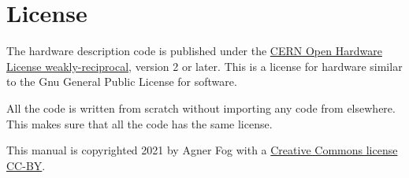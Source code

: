 \documentclass[11pt,a4paper,oneside,openright]{report}
\newcommand{\vv}{ \vspace{2mm} }   %
\begin{document}
\chapter{License}
The hardware description code is published under the \href{https://cern-ohl.web.cern.ch/}{CERN Open Hardware License weakly-reciprocal}, version 2 or later. This is a license for hardware similar to the Gnu General Public License for software. 
\vv

All the code is written from scratch without importing any code from elsewhere. This makes sure that all the code has the same license.
\vv

This manual is copyrighted 2021 by Agner Fog with a 
\href{https://creativecommons.org/licenses/by/4.0/legalcode}{Creative Commons license CC-BY}.
\end{document}
